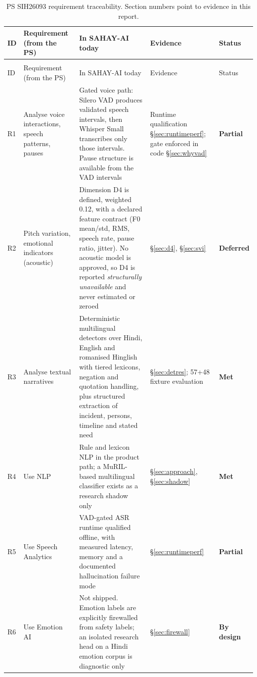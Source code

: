 \documentclass[11pt,a4paper]{article}
\newcommand{\yes}{\textcolor{sahaygreen}{\textbf{Met}}}
\newcommand{\partly}{\textcolor{sahayorange}{\textbf{Partial}}}
\newcommand{\defer}{\textcolor{sahaygray}{\textbf{Deferred}}}
\newcommand{\bydesign}{\textcolor{sahaypurple}{\textbf{By design}}}
\begin{document}
\setlength{\tabcolsep}{4pt}
\begin{longtable}{@{}>{\raggedright\arraybackslash}p{0.7cm}>{\raggedright\arraybackslash}p{3.2cm}>{\raggedright\arraybackslash}p{5.5cm}>{\raggedright\arraybackslash}p{2.9cm}>{\raggedright\arraybackslash}p{1.75cm}@{}}
\caption{PS SIH26093 requirement traceability. Section numbers point to evidence in this report.}
\label{tab:trace}\\
\toprule
ID & Requirement (from the PS) & In SAHAY-AI today & Evidence & Status \\
\midrule
\endfirsthead
\multicolumn{5}{@{}l}{\small\itshape Table~\ref{tab:trace} continued}\\
\toprule
ID & Requirement (from the PS) & In SAHAY-AI today & Evidence & Status \\
\midrule
\endhead
\bottomrule
\endfoot
R1 & Analyse voice interactions, speech patterns, pauses & Gated voice path: Silero VAD produces
validated speech intervals, then Whisper Small transcribes only those intervals. Pause structure is
available from the VAD intervals & Runtime qualification \S\ref{sec:runtimeperf}; gate enforced in
code \S\ref{sec:whyvad} & \partly \\
R2 & Pitch variation, emotional indicators (acoustic) & Dimension D4 is defined, weighted 0.12, with
a declared feature contract (F0 mean/std, RMS, speech rate, pause ratio, jitter). No acoustic model
is approved, so D4 is reported \emph{structurally unavailable} and never estimated or zeroed &
\S\ref{sec:d4}, \S\ref{sec:svi} & \defer \\
R3 & Analyse textual narratives & Deterministic multilingual detectors over Hindi, English and
romanised Hinglish with tiered lexicons, negation and quotation handling, plus structured extraction
of incident, persons, timeline and stated need & \S\ref{sec:detres}; 57+48 fixture evaluation &
\yes \\
R4 & Use NLP & Rule and lexicon NLP in the product path; a MuRIL-based multilingual classifier
exists as a research shadow only & \S\ref{sec:approach}, \S\ref{sec:shadow} & \yes \\
R5 & Use Speech Analytics & VAD-gated ASR runtime qualified offline, with measured latency, memory
and a documented hallucination failure mode & \S\ref{sec:runtimeperf} & \partly \\
R6 & Use Emotion AI & Not shipped. Emotion labels are explicitly firewalled from safety labels; an
isolated research head on a Hindi emotion corpus is diagnostic only & \S\ref{sec:firewall} &
\bydesign \\

\end{longtable}
\end{document}
